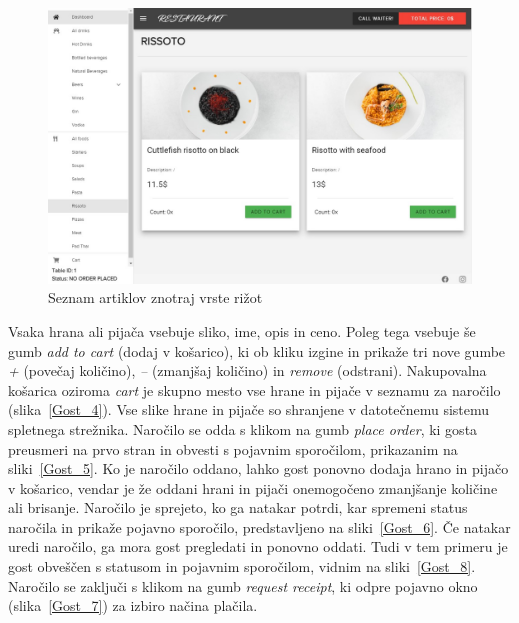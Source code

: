 \documentclass[a4paper, 12pt]{book}
\begin{document}
\begin{figure}[!htb]
\centering
\includegraphics[width=13.7cm]{customer_1.jpg}
\caption{Seznam artiklov znotraj vrste rižot}
\label{Gost_3}
\end{figure}
Vsaka hrana ali pijača vsebuje sliko, ime, opis in ceno. Poleg tega vsebuje še gumb \textit{add to cart} (dodaj v košarico), ki ob kliku izgine in prikaže tri nove gumbe \textit{+} (povečaj količino), \textit{–} (zmanjšaj količino) in \textit{remove} (odstrani). Nakupovalna košarica oziroma \textit{cart} je skupno mesto vse hrane in pijače v seznamu za naročilo (slika~\ref{Gost_4}). Vse slike hrane in pijače so shranjene v datotečnemu sistemu spletnega strežnika. Naročilo se odda s klikom na gumb \textit{place order}, ki gosta preusmeri na prvo stran in obvesti s pojavnim sporočilom, prikazanim na sliki~\ref{Gost_5}. Ko je naročilo oddano, lahko gost ponovno dodaja hrano in pijačo v košarico, vendar je že oddani hrani in pijači onemogočeno zmanjšanje količine ali brisanje. Naročilo je sprejeto, ko ga natakar potrdi, kar spremeni status naročila in prikaže pojavno sporočilo, predstavljeno na sliki~\ref{Gost_6}. Če natakar uredi naročilo, ga mora gost pregledati in ponovno oddati. Tudi v tem primeru je gost obveščen s statusom in pojavnim sporočilom, vidnim na sliki~\ref{Gost_8}. Naročilo se zaključi s klikom na gumb \textit{request receipt}, ki odpre pojavno okno (slika~\ref{Gost_7}) za izbiro načina plačila.
\end{document}
